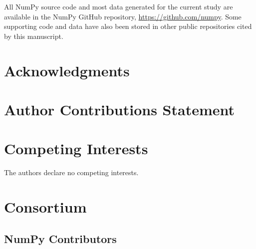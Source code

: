 \documentclass[fleqn,10pt]{wlscirep}
\begin{document}
All NumPy source code and most data generated for the current study are
available in the NumPy GitHub repository, \url{https://github.com/numpy}. Some
supporting code and data have also been stored in other public repositories
cited by this manuscript.



\section*{Acknowledgments}


\section*{Author Contributions Statement}




\section*{Competing Interests}

The authors declare no competing interests.




\section*{Consortium}
\subsection*{NumPy Contributors}

\end{document}
